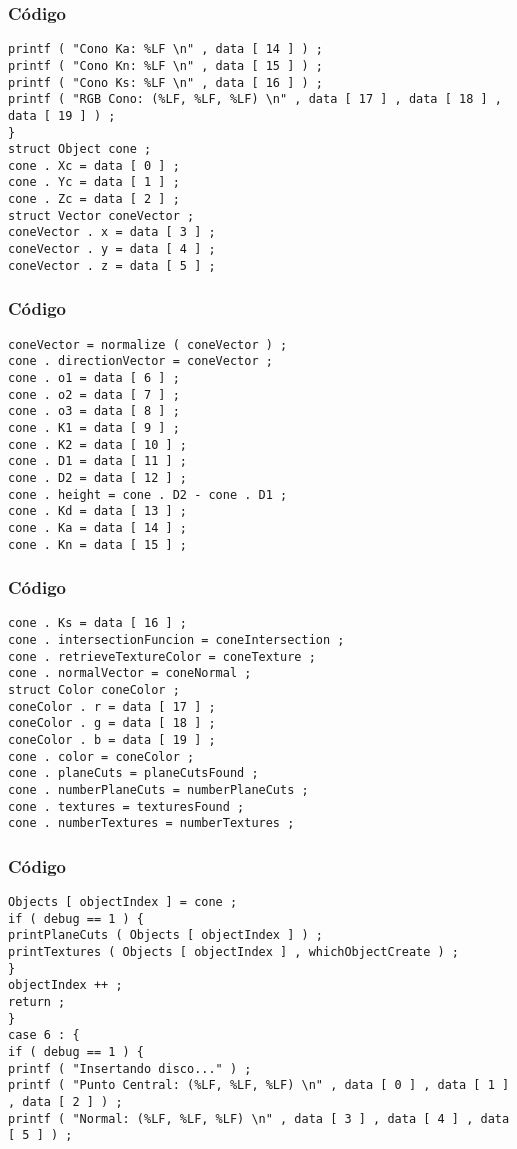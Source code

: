 \documentclass{beamer}
\begin{document}
\begin{frame}[fragile]
\frametitle{C\'odigo}
\begin{verbatim}
printf ( "Cono Ka: %LF \n" , data [ 14 ] ) ; 
printf ( "Cono Kn: %LF \n" , data [ 15 ] ) ; 
printf ( "Cono Ks: %LF \n" , data [ 16 ] ) ; 
printf ( "RGB Cono: (%LF, %LF, %LF) \n" , data [ 17 ] , data [ 18 ] , data [ 19 ] ) ; 
} 
struct Object cone ; 
cone . Xc = data [ 0 ] ; 
cone . Yc = data [ 1 ] ; 
cone . Zc = data [ 2 ] ; 
struct Vector coneVector ; 
coneVector . x = data [ 3 ] ; 
coneVector . y = data [ 4 ] ; 
coneVector . z = data [ 5 ] ; 
\end{verbatim}
\end{frame}
\begin{frame}[fragile]
\frametitle{C\'odigo}
\begin{verbatim}
coneVector = normalize ( coneVector ) ; 
cone . directionVector = coneVector ; 
cone . o1 = data [ 6 ] ; 
cone . o2 = data [ 7 ] ; 
cone . o3 = data [ 8 ] ; 
cone . K1 = data [ 9 ] ; 
cone . K2 = data [ 10 ] ; 
cone . D1 = data [ 11 ] ; 
cone . D2 = data [ 12 ] ; 
cone . height = cone . D2 - cone . D1 ; 
cone . Kd = data [ 13 ] ; 
cone . Ka = data [ 14 ] ; 
cone . Kn = data [ 15 ] ; 
\end{verbatim}
\end{frame}
\begin{frame}[fragile]
\frametitle{C\'odigo}
\begin{verbatim}
cone . Ks = data [ 16 ] ; 
cone . intersectionFuncion = coneIntersection ; 
cone . retrieveTextureColor = coneTexture ; 
cone . normalVector = coneNormal ; 
struct Color coneColor ; 
coneColor . r = data [ 17 ] ; 
coneColor . g = data [ 18 ] ; 
coneColor . b = data [ 19 ] ; 
cone . color = coneColor ; 
cone . planeCuts = planeCutsFound ; 
cone . numberPlaneCuts = numberPlaneCuts ; 
cone . textures = texturesFound ; 
cone . numberTextures = numberTextures ; 
\end{verbatim}
\end{frame}
\begin{frame}[fragile]
\frametitle{C\'odigo}
\begin{verbatim}
Objects [ objectIndex ] = cone ; 
if ( debug == 1 ) { 
printPlaneCuts ( Objects [ objectIndex ] ) ; 
printTextures ( Objects [ objectIndex ] , whichObjectCreate ) ; 
} 
objectIndex ++ ; 
return ; 
} 
case 6 : { 
if ( debug == 1 ) { 
printf ( "Insertando disco..." ) ; 
printf ( "Punto Central: (%LF, %LF, %LF) \n" , data [ 0 ] , data [ 1 ] , data [ 2 ] ) ; 
printf ( "Normal: (%LF, %LF, %LF) \n" , data [ 3 ] , data [ 4 ] , data [ 5 ] ) ; 
\end{verbatim}
\end{frame}
\end{document}
